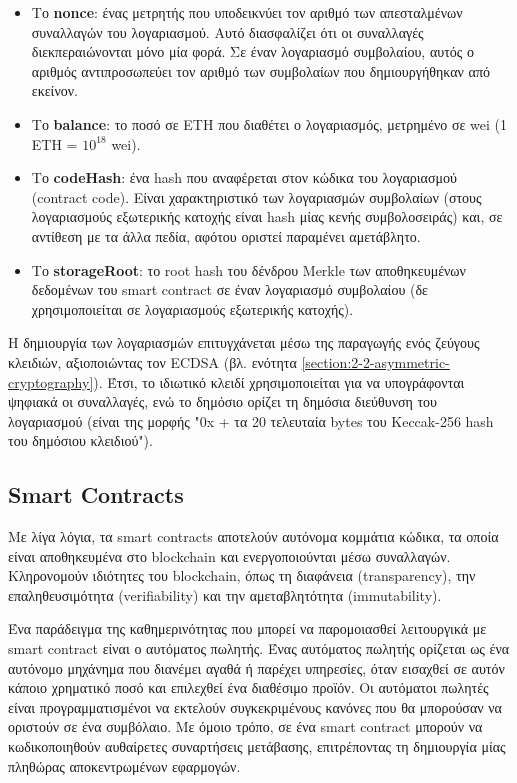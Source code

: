 \begin{itemize}
	\item Το \textbf{nonce}: ένας μετρητής που υποδεικνύει τον αριθμό των απεσταλμένων συναλλαγών του λογαριασμού. Αυτό διασφαλίζει ότι οι συναλλαγές διεκπεραιώνονται μόνο μία φορά. Σε έναν λογαριασμό συμβολαίου, αυτός ο αριθμός αντιπροσωπεύει τον αριθμό των συμβολαίων που δημιουργήθηκαν από εκείνον.

	\item Το \textbf{balance}: το ποσό σε ETH που διαθέτει ο λογαριασμός, μετρημένο σε wei (1 ETH = $10^{18}$ wei).

	\item Το \textbf{codeHash}: ένα hash που αναφέρεται στον κώδικα του λογαριασμού (contract code). Είναι χαρακτηριστικό των λογαριασμών συμβολαίων (στους λογαριασμούς εξωτερικής κατοχής είναι hash μίας κενής συμβολοσειράς) και, σε αντίθεση με τα άλλα πεδία, αφότου οριστεί παραμένει αμετάβλητο.

	\item Το \textbf{storageRoot}: το root hash του δένδρου Merkle των αποθηκευμένων δεδομένων του smart contract σε έναν λογαριασμό συμβολαίου (δε χρησιμοποιείται σε λογαριασμούς εξωτερικής κατοχής).
\end{itemize}

Η δημιουργία των λογαριασμών επιτυγχάνεται μέσω της παραγωγής ενός ζεύγους κλειδιών, αξιοποιώντας τον 
ECDSA (βλ. ενότητα \ref{section:2-2-asymmetric-cryptography}). Έτσι, το ιδιωτικό κλειδί χρησιμοποιείται για να υπογράφονται ψηφιακά οι συναλλαγές, ενώ το δημόσιο ορίζει τη δημόσια διεύθυνση του λογαριασμού (είναι της μορφής "0x + τα 20 τελευταία bytes του Keccak-256 hash του δημόσιου κλειδιού").

\subsection{Smart Contracts}
Με λίγα λόγια, τα smart contracts αποτελούν αυτόνομα κομμάτια κώδικα, τα οποία είναι αποθηκευμένα στο blockchain και ενεργοποιούνται μέσω συναλλαγών. Κληρονομούν ιδιότητες του blockchain, όπως τη διαφάνεια (transparency), την επαληθευσιμότητα (verifiability) και την αμεταβλητότητα (immutability).

Ένα παράδειγμα της καθημερινότητας που μπορεί να παρομοιασθεί λειτουργικά με smart contract είναι ο αυτόματος πωλητής.\cite{2.6-ethereum-smart-contracts} Ένας αυτόματος πωλητής ορίζεται ως ένα αυτόνομο μηχάνημα που διανέμει αγαθά ή παρέχει υπηρεσίες, όταν εισαχθεί σε αυτόν κάποιο χρηματικό ποσό και επιλεχθεί ένα διαθέσιμο προϊόν. Οι αυτόματοι πωλητές είναι προγραμματισμένοι να εκτελούν συγκεκριμένους κανόνες που θα μπορούσαν να οριστούν σε ένα συμβόλαιο. Με όμοιο τρόπο, σε ένα smart contract μπορούν να κωδικοποιηθούν αυθαίρετες συναρτήσεις μετάβασης, επιτρέποντας τη δημιουργία μίας πληθώρας αποκεντρωμένων εφαρμογών.

